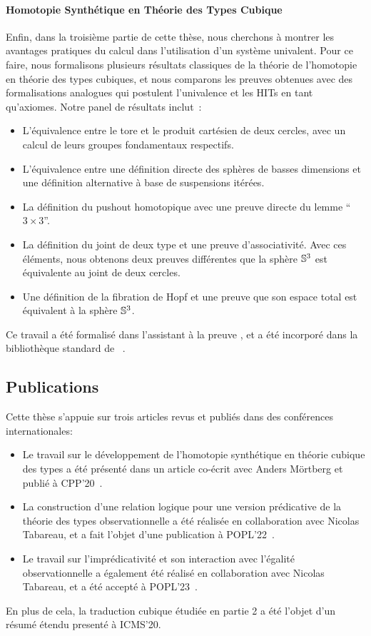 \paragraph{Homotopie Synthétique en Théorie des Types Cubique}
% 
Enfin, dans la troisième partie de cette thèse, nous cherchons à montrer les 
avantages pratiques du calcul dans l'utilisation d'un système univalent.
% 
Pour ce faire, nous formalisons plusieurs résultats classiques de la théorie 
de l'homotopie en théorie des types cubiques, et nous comparons les preuves 
obtenues avec des formalisations analogues qui postulent l'univalence et les
HITs en tant qu'axiomes. 
% 
Notre panel de résultats inclut~:
%
\begin{itemize}
\item L'équivalence entre le tore et le produit cartésien de deux cercles,
  avec un calcul de leurs groupes fondamentaux respectifs.
\item L'équivalence entre une définition directe des sphères de basses 
  dimensions et une définition alternative à base de suspensions itérées.
\item La définition du pushout homotopique avec une preuve directe du lemme
  ``\( 3 \times 3 \)''.
\item La définition du joint de deux type et une preuve d'associativité. 
  Avec ces éléments, nous obtenons deux preuves différentes que la sphère $\mathbb{S}^3$
  est équivalente au joint de deux cercles.
\item Une définition de la fibration de Hopf et une preuve que son espace total
  est équivalent à la sphère $\mathbb{S}^3$.
\end{itemize}

Ce travail a été formalisé dans l'assistant à la preuve \Agda, et a été incorporé dans
la bibliothèque standard de \CubicalAgda~.

\subsection{Publications}

Cette thèse s'appuie sur trois articles revus et publiés dans des conférences internationales:
\begin{itemize}
\item Le travail sur le développement de l'homotopie synthétique en théorie
  cubique des types a été présenté dans un article co-écrit avec Anders 
  Mörtberg et publié à CPP'20~.
\item La construction d'une relation logique pour une version prédicative
  de la théorie des types observationnelle a été réalisée en collaboration
  avec Nicolas Tabareau, et a fait l'objet d'une publication à POPL'22~.
\item Le travail sur l'imprédicativité et son interaction avec l'égalité 
  observationnelle a également été réalisé en collaboration avec Nicolas
  Tabareau, et a été accepté à POPL'23~. 
\end{itemize}
En plus de cela, la traduction cubique étudiée en partie 2 a été l'objet d'un
résumé étendu presenté à ICMS'20.

